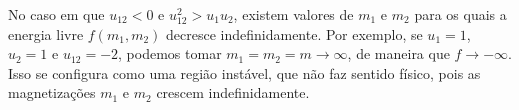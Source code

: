 \documentclass[a4paper,10pt]{article}
\begin{document}
\n\n

No caso em que $u_{12} < 0$ e $u_{12}^2 > u_1 u_2$, existem valores de $m_1$ e $m_2$ para os quais a energia livre $f(m_1, m_2)$ decresce indefinidamente. Por exemplo, se $u_1 = 1$, $u_2 = 1$ e $u_{12} = -2$, podemos tomar $m_1 = m_2 = m \to \infty$, de maneira que $f \to -\infty$. Isso se configura como uma região instável, que não faz sentido físico, pois as magnetizações $m_1$ e $m_2$ crescem indefinidamente.


%
%
\end{document}
